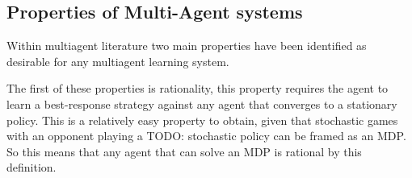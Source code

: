 \documentclass[conference]{IEEEtran}
\newcommand\katja[1]{{\color{dark-cyan}Katja: #1}}
\newcommand\TODO[1]{{\color{red}TODO: #1}}
\begin{document}
%

\subsection{Properties of Multi-Agent systems}

Within multiagent literature two main properties have been identified as desirable for any multiagent learning system.

The first of these properties is rationality, this property requires the agent to learn a best-response strategy against any agent that converges to a stationary policy. This is a relatively easy property to obtain, given that stochastic games with an opponent playing a \TODO{stochastic policy} can be framed as an MDP. So this means that any agent that can solve an MDP is rational by this definition\cite{bowling2002multiagent}.
\end{document}
